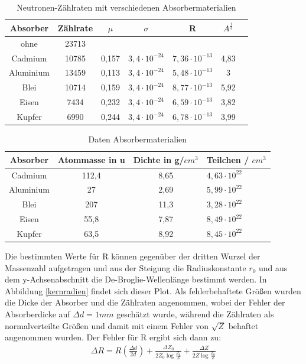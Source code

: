 \begin{table}[h]
	\caption{Neutronen-Zählraten mit verschiedenen Absorbermaterialien}
	\begin{tabular}{|c|c|c|c|c|c|}
	\hline
	 Absorber & Zählrate & $\mu$ & $\sigma$ & R & $A^\frac{1}{3}$ \\ \hline
	  ohne & 23713 &  &  &  & &  &   \\ \hline
	   Cadmium & 10785  & 0,157 & $3,4\cdot 10^{-24}$ & $7,36 \cdot 10^{-13}$ & 4,83\\ \hline
	    Aluminium & 13459 & 0,113 & $3,4\cdot 10^{-24}$ & $5,48 \cdot 10^{-13}$  & 3 \\ \hline
	     Blei & 10714  & 0,159 & $3,4\cdot 10^{-24}$ & $8,77 \cdot 10^{-13}$  & 5,92 \\ \hline
	      Eisen & 7434  & 0,232 & $3,4\cdot 10^{-24}$ & $6,59 \cdot 10^{-13}$  & 3,82 \\ \hline
	       Kupfer & 6990 & 0,244 & $3,4\cdot 10^{-24}$ & $6,78 \cdot 10^{-13}$  & 3,99\\ \hline
	\end{tabular}
\label{werte}
\end{table}

\begin{table}[h]
	\caption{Daten Absorbermaterialien}
	\begin{tabular}{|c|c|c|}
	\hline
	 Absorber & Atommasse in u & Dichte in g/$cm^3$ & Teilchen / $cm^3$ \\ \hline
	   Cadmium & 112,4  & 8,65 & $4,63 \cdot 10^{22}$ \\ \hline
	    Aluminium & 27 & 2,69 & $5,99 \cdot 10^{22}$ \\ \hline
	     Blei & 207  & 11,3 & $3,28 \cdot 10^{22}$  \\ \hline
	      Eisen & 55,8  & 7,87 & $8,49 \cdot 10^{22}$ \\ \hline
	       Kupfer & 63,5 & 8,92 & $8,45 \cdot 10^{22}$ \\ \hline
	\end{tabular}
\label{werte2}
\end{table}

Die bestimmten Werte für R können gegenüber der dritten Wurzel der Massenzahl aufgetragen und aus der Steigung die Radiuskonstante $r_0$ und aus dem y-Achsenabschnitt die De-Broglie-Wellenlänge bestimmt werden. In Abbildung \ref{kernradien} findet sich dieser Plot. Als fehlerbehaftete Größen wurden die Dicke der Absorber und die Zählraten angenommen, wobei der Fehler der Absorberdicke auf $\Delta d = 1mm$ geschätzt wurde, während die Zählraten als normalverteilte Größen und damit mit einem Fehler von $\sqrt{Z}$ behaftet angenommen wurden. Der Fehler für R ergibt sich dann zu:
\begin{align} 
\Delta R = R \left(\frac{\Delta d}{2d}\right) + \frac{\Delta Z_0}{2Z_0\log\frac{Z_0}{Z}}+\frac{\Delta Z}{2Z\log\frac{Z_0}{Z}}
\end{align}

